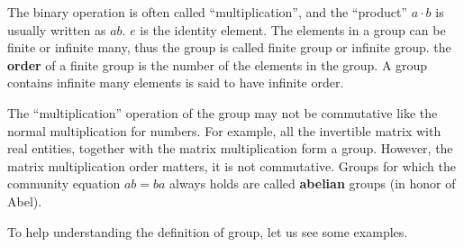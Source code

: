 \documentclass{article}
\begin{document}
The binary operation is often called ``multiplication'', and the ``product'' $a \cdot b$ is usually written as $ab$. $e$ is the identity element. The elements in a group can be finite or infinite many, thus the group is called finite group or infinite group. the \textbf{order} of a finite group is the number of the elements in the group. A group contains infinite many elements is said to have infinite order.

The ``multiplication'' operation of the group may not be commutative like the normal multiplication for numbers. For example, all the invertible matrix with real entities, together with the matrix multiplication form a group. However, the matrix multiplication order matters, it is not commutative. Groups for which the community equation $ab = ba$ always holds are called \textbf{abelian} groups (in honor of Abel).

To help understanding the definition of group, let us see some examples.
\end{document}

